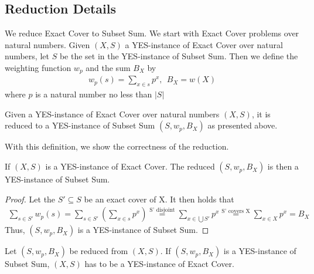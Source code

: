 \subsection{Reduction Details}
We reduce Exact Cover to Subset Sum. We start with Exact Cover problems over natural numbers. 
Given $(X, S)$ a YES-instance of Exact Cover over natural numbers, let $S$ be the set in the YES-instance of Subset Sum. Then we
define the weighting function $w_{p}$ and the sum $B_{X}$ by 
\begin{align*}
    w_p(s) = \sum_{x \in s} p^x, \ \ B_X = w(X)
\end{align*}
where $p$ is a natural number no less than $|S|$
\begin{definition}
    Given a YES-instance of Exact Cover over natural numbers $(X, S)$, 
    it is reduced to a YES-instance of Subset Sum $(S, w_p, B_X)$ as presented above.
\end{definition}
With this definition, we show the correctness of the reduction.
\begin{lemma}[Soundness]
    If $(X, S)$ is a YES-instance of Exact Cover. The reduced $(S, w_p, B_X)$ is then a YES-instance of Subset Sum. 
    \label{lemma:7}
\end{lemma}
\begin{proof}
    Let the $S' \subseteq S$ be an exact cover of X. It then holds that
\begin{align*}
    \sum_{s \in S'} w_p(s) = \sum_{s \in S'} (\sum_{x \in s} p^x) 
    \stackrel{\text{S' disjoint}}{=} \sum_{x \in \bigcup S'} p^x 
    \stackrel{\text{S' covers X}}{=} \sum_{x \in X} p^x = B_X
\end{align*}
Thus, $(S, w_p, B_X)$ is a YES-instance of Subset Sum. 
\end{proof}
\begin{lemma}[Completeness]
    Let $(S, w_p, B_X)$ be reduced from $(X, S)$. If $(S, w_p, B_X)$ is a YES-instance of Subset Sum, 
    $(X, S)$ has to be a YES-instance of Exact Cover.
    \label{lemma:8} 
\end{lemma}
